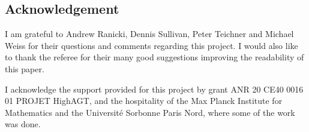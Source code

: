 
\subsection*{Acknowledgement}

I am grateful to Andrew Ranicki, Dennis Sullivan, Peter Teichner and Michael Weiss for their questions and comments regarding this project.
I would also like to thank the referee for their many good suggestions improving the readability of this paper.

I acknowledge the support provided for this project by grant ANR 20 CE40 0016 01 PROJET HighAGT, and the hospitality of the Max Planck Institute for Mathematics and the Universit\'e Sorbonne Paris Nord, where some of the work was done.